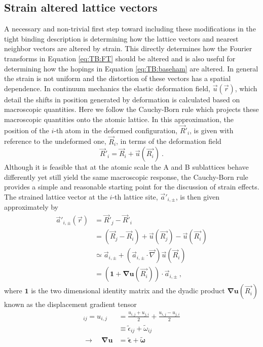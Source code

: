 \subsection{Strain altered lattice vectors}
A necessary and non-trivial first step toward including these modifications in the tight binding description is determining how the lattice vectors and nearest neighbor vectors are altered by strain.
This directly determines how the Fourier transforms in Equation \ref{eq:TB:FT} should be altered and is also useful for determining how the hopings in Equation \ref{eq:TB:baseham} are altered.
In general the strain is not uniform and the distortion of these vectors has a spatial dependence.
In continuum mechanics the elastic deformation field, $\vec{u}(\vec{r})$, which detail the shifts in position generated by  deformation is calculated based on macroscopic quantities.
Here we follow the Cauchy-Born rule which projects these macroscopic quantities onto the atomic lattice.
In this approximation, the position of the $i$-th atom in the deformed configuration, $\vec{R}'_i$, is given with reference to the undeformed one, $\vec{R}_i$, in terms of the deformation field
\begin{equation*}
  \vec{R}'_{i}=\vec{R}_{i}+\vec{u}(\vec{R_i}) \ .
\end{equation*}
Although it is feasible that at the atomic scale the A and B sublattices behave differently yet still yield the same macroscopic response, the Cauchy-Born rule provides a simple and reasonable starting point for the discussion of strain effects.
The strained lattice vector at the $i$-th lattice site, $\vec{a}'_{i,\pm}$, is then given approximately by
\begin{align}
  \vec{a}'_{i,\pm}(\vec{r})&=\vec{R}'_j-\vec{R}'_i \nonumber\\
                              &=(\vec{R}_j-\vec{R}_i)+\vec{u}(\vec{R_j})-\vec{u}(\vec{R_i}) \nonumber \\
                              &\simeq\vec{a}_{i,\pm}+(\vec{a}_{i,\pm} \cdot \vec{\nabla}) \vec{u}(\vec{R}_i) \nonumber \\
                              &=\left(\bm{1}+\bm{\nabla u}(\vec{R_i}) \right)\cdot \vec{a}_{i,\pm} \label{eq:PVP:StrainVectors} \ ,
\end{align}
where $\bm{1}$ is the two dimensional identity matrix and the dyadic product $\bm{\nabla u}(\vec{R_i})$ known as the displacement gradient tensor
\begin{align*}
  [\bm{\nabla u}]_{ij} = u_{i,j} &= \frac{u_{i,j}+u_{j,i}}{2} + \frac{u_{i,j}-u_{j,i}}{2} \\
                       &\equiv \tilde{\epsilon}_{ij} + \tilde{\omega}_{ij} \\
    \rightarrow \quad \bm{\nabla u} &= \tilde{\bm{\epsilon}} + \tilde{\bm{\omega}}
\end{align*}
